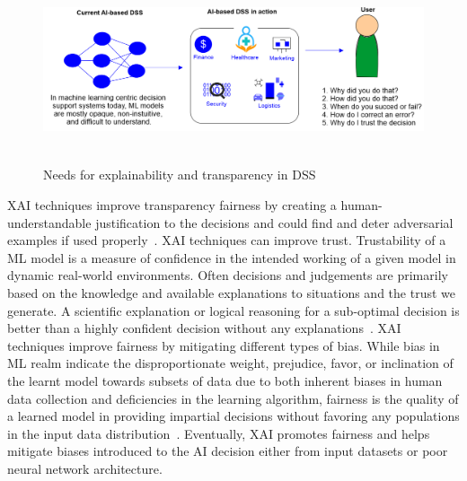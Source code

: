 \begin{figure}[h]
	\centering
	\includegraphics[width=\textwidth,height=55mm]{images/why_xai.png}	
    \caption{Needs for explainability and transparency in DSS}	
	\label{fig:need_for_xai}
\end{figure}

\hspace*{3.5mm} XAI techniques improve transparency fairness by creating a human-understandable justification to the decisions and could find and deter adversarial examples if used properly~\cite{das2020opportunities}. XAI techniques can improve trust. Trustability of a ML model is a measure of confidence in the intended working of a given model in dynamic real-world environments. Often decisions and judgements are primarily based on the knowledge and available explanations to situations and the trust we generate. A scientific explanation or logical reasoning for a sub-optimal decision is better than a highly confident decision without any explanations~\cite{das2020opportunities}. XAI techniques improve fairness by mitigating different types of bias. While bias in ML realm indicate the disproportionate weight, prejudice, favor, or inclination of the learnt model towards subsets of data due to both inherent biases in human data collection and deficiencies in the learning algorithm, fairness is the quality of a learned model in providing impartial decisions without favoring any populations in the input data distribution~\cite{das2020opportunities}.
Eventually, XAI promotes fairness and helps mitigate biases introduced to the AI decision either from input datasets or poor neural network architecture.

